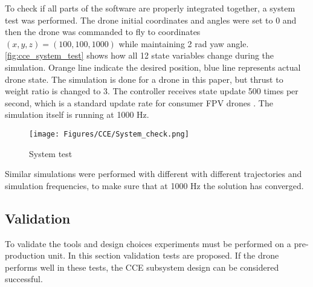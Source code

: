 To check if all parts of the software are properly integrated together, a system test was performed. The drone initial coordinates and angles were set to 0 and then the drone was commanded to fly to coordinates $(x,y,z) = (100,100,1000)$ while maintaining 2 rad yaw angle. \autoref{fig:cce_system_test} shows how all 12 state variables change during the simulation. Orange line indicate the desired position, blue line represents actual drone state. The simulation is done for a drone in this paper\cite{ref_drone_param}, but thrust to weight ratio is changed to 3. The controller receives state update 500 times per second, which is a standard update rate for consumer FPV drones \cite{PID_frequency}.  The simulation itself is running at 1000 Hz. 

\begin{figure}[H]
    \centering
    \texttt{[image: Figures/CCE/System\_check.png]}
    \caption{System test}
    \label{fig:cce_system_test}
\end{figure}

Similar simulations were performed with different with different trajectories and simulation frequencies, to make sure that at 1000 Hz the solution has converged. 


\subsection{Validation}
\label{sec:cce_validation}
To validate the tools and design choices experiments must be performed on a pre-production unit. In this section validation tests are proposed. If the drone performs well in these tests, the CCE subsystem design can be considered successful.  


